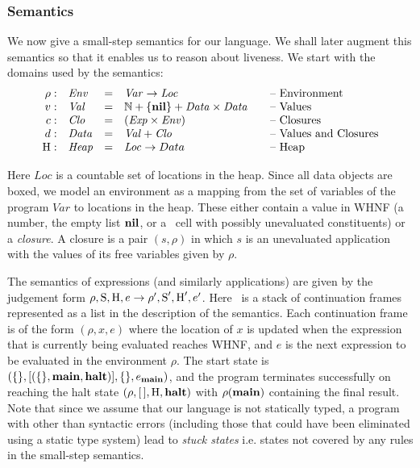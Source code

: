 \subsubsection{Semantics}
We now give  a small-step semantics for our  language.  We shall later
augment this semantics so that it enables us to reason about liveness.
We start with the domains used by the semantics:
\[
\begin{array}{rlcl@{\hspace{2em}}l}
\rho: & \mathit{Env} &=&\mathit{Var} \rightarrow \mathit{Loc} & \mbox{-- Environment} \\ 
v:   & \mathit{Val} &=& \mathbb{N} + \{\NIL\} + \mathit{Data \times
  Data}& \mbox{-- Values}\\
c:   & \mathit{Clo} &=& \mathit{(Exp \times Env)}& \mbox{--
  Closures}\\
d: & \mathit{Data} &=&\mathit{Val} + \mathit{Clo} & \mbox{-- Values and Closures} \\ 
\heap: & \mathit{Heap} & =&\mathit{Loc} \rightarrow Data & \mbox{-- Heap}
\end{array}
\]

Here $\mathit{Loc}$ is a countable set  of locations in the heap.  Since
all data objects are boxed, we  model an environment as a mapping from
the set of variables of the program $\mathit{Var}$ to locations in the
heap.  These either contain a value  in WHNF (a number, the empty list
$\mbox{$\mathbf{ nil}$}$, or  a \CONS\ cell with possibly unevaluated constituents)
or a {\em closure}.   A closure is a pair $(s, \rho)$  in which $s$ is
an  unevaluated application  with  the values  of  its free  variables
given by $\rho$.

The semantics of expressions (and similarly applications) are given by
the  judgement form $\rho,  \mbox{S}, \mbox{H},  e \rightarrow  \rho', \mbox{S}',
\mbox{H}', e'$.  Here \stk\ is a stack of continuation frames represented
as  a list  in the  description of  the semantics.   Each continuation
frame  is of the  form $(\rho,  x, e)$  where the  location of  $x$ is
updated when the expression  that is currently being evaluated reaches
WHNF,  and  $e$  is  the  next  expression  to  be  evaluated  in  the
environment  $\rho$.   The  start  state is  $(\{\},[(\{\},  \mathbf{main},
  \mbox{$\mathbf{halt}$})], \{\}, e_{\mathbf{main}})$, and the program terminates successfully
on  reaching   the  halt   state  $(\rho,[\,],  \mbox{H},   \mbox{$\mathbf{halt}$})$  with
$\rho(\mathbf{main})$  containing  the final  result.  Note  that since  we
assume that our language is not statically typed, a program with other
than syntactic errors (including those that could have been eliminated
using a  static type system) lead  to {\em stuck  states} i.e.  states
not covered by any rules in the small-step semantics.

